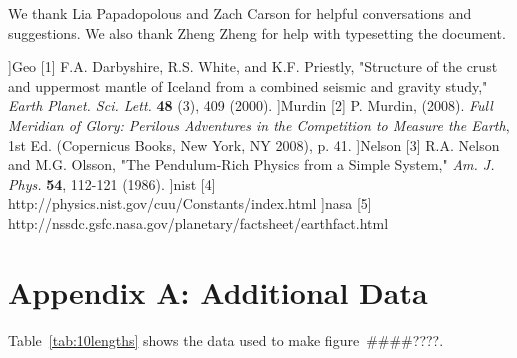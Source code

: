 \documentclass[iop]{emulateapj}
\def\fillin{\#\#\#\#????}
\begin{document}
\begin{figure*}
\acknowledgments

We thank Lia Papadopolous and Zach Carson for helpful conversations and 
suggestions.  We also thank Zheng Zheng for help with typesetting the 
document.






\begin{thebibliography}{}

\bibitem[[1]]{Geo}
[1] F.A. Darbyshire, R.S. White, and K.F. Priestly, "Structure of the crust and uppermost mantle of Iceland from a combined seismic and gravity study," {\it Earth Planet. Sci. Lett.} {\bf 48} (3), 409 (2000).
\bibitem[[2]]{Murdin}
[2] P. Murdin, (2008). {\it Full Meridian of Glory: Perilous Adventures in the Competition to Measure the Earth}, 1st Ed. (Copernicus Books, New York, NY 2008), p. 41.
\bibitem[[3]]{Nelson}
[3] R.A. Nelson and M.G. Olsson, "The Pendulum-Rich Physics from a Simple System," {\it Am. J. Phys.} {\bf 54}, 112-121 (1986).
\bibitem[[4]]{nist}
[4] http://physics.nist.gov/cuu/Constants/index.html
\bibitem[[5]]{nasa}
[5] http://nssdc.gsfc.nasa.gov/planetary/factsheet/earthfact.html


\end{thebibliography}{}



\appendix
{}
\section{Appendix A: Additional Data}

Table~\ref{tab:10lengths} shows the data used to make figure~\fillin.


\end{figure*}
\end{document}
